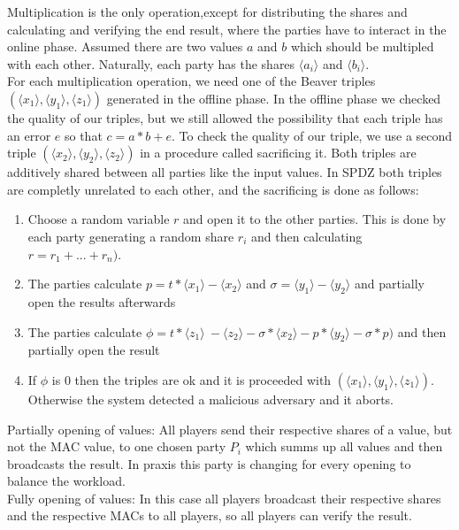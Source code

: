 \documentclass[english,runningheads,a4paper]{llncs}[2018/03/10]
\begin{document}
Multiplication is the only operation,except for distributing the shares and calculating and verifying the end result, where the parties have to interact in the online phase.
Assumed there are two values \( a\) and \( b\) which should be multipled with each other. Naturally, each party has the shares \(\langle a_i\rangle \) and \(\langle b_i\rangle \).\\
For each multiplication operation, we need one of the Beaver triples \( (\langle x_1 \rangle ,\langle y_1\rangle , \langle z_1\rangle )\) generated in the offline phase. In the offline phase we checked the quality of our triples, but we still allowed the possibility that each triple has an error \(e\) so that \(c=a*b+e\). To check the quality of our triple, we use a second triple \( (\langle x_2 \rangle ,\langle y_2\rangle ,\langle z_2\rangle )\) in a procedure called sacrificing it. Both triples are additively shared between all parties like the input values. In SPDZ both triples are completly unrelated to each other, and the sacrificing is done as follows:\\


\begin{enumerate}
\item Choose a random variable \( r\) and open it to the other parties. This is done by each party generating a random share \(r_i\) and then calculating \(r=r_1+...+r_n)\).
\item The parties calculate  \( p=t*\langle x_1 \rangle - \langle x_2 \rangle \) and \( \sigma=\langle y_1 \rangle -  \langle y_2 \rangle \) and partially open the results afterwards
\item The parties calculate \(\phi = t * \langle z_1 \rangle\ - \langle z_2 \rangle - \sigma * \langle x_2 \rangle - p * \langle y_2 \rangle - \sigma * p)\) and then partially open the result
\item If \( \phi \) is 0 then the triples are ok and it is proceeded with \( (\langle x_1 \rangle ,\langle y_1\rangle , \langle z_1\rangle )\). Otherwise the system detected a malicious adversary and it aborts.\\
\end{enumerate}


Partially opening  of values: All players send their respective shares of a value, but not the MAC value, to one chosen party \(P_i\) which summs up all values and then broadcasts the result. In praxis this party is changing for every opening to balance the workload.\\
Fully opening of values: In this case all players broadcast their respective shares and the respective MACs to all players, so all players can verify the result.\\
\end{document}
